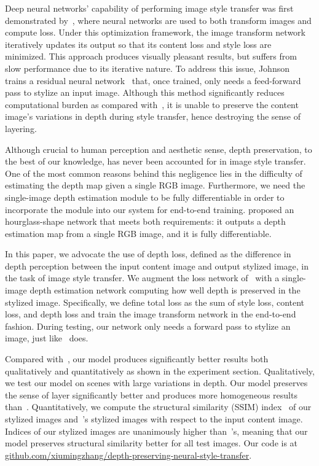 \documentclass[10pt,twocolumn,letterpaper]{article}
\begin{document}
Deep neural networks' capability of performing image style transfer was first demonstrated by~\cite{gatys2016image}, where neural networks are used to both transform images and compute loss. Under this optimization framework, the image transform network iteratively updates its output so that its content loss and style loss are minimized. This approach produces visually pleasant results, but suffers from slow performance due to its iterative nature. To address this issue, Johnson \etal~\cite{johnson2016perceptual} trains a residual neural network~\cite{he2016deep} that, once trained, only needs a feed-forward pass to stylize an input image. Although this method significantly reduces computational burden as compared with~\cite{gatys2016image}, it is unable to preserve the content image's variations in depth during style transfer, hence destroying the sense of layering.

Although crucial to human perception and aesthetic sense, depth preservation, to the best of our knowledge, has never been accounted for in image style transfer. One of the most common reasons behind this negligence lies in the difficulty of estimating the depth map given a single RGB image. Furthermore, we need the single-image depth estimation module to be fully differentiable in order to incorporate the module into our system for end-to-end training. \cite{chen2016single} proposed an hourglass-shape network that meets both requirements: it outputs a depth estimation map from a single RGB image, and it is fully differentiable. 

In this paper, we advocate the use of depth loss, defined as the difference in depth perception between the input content image and output stylized image, in the task of image style transfer. We augment the loss network of~\cite{johnson2016perceptual} with a single-image depth estimation network computing how well depth is preserved in the stylized image. Specifically, we define total loss as the sum of style loss, content loss, and depth loss and train the image transform network in the end-to-end fashion. During testing, our network only needs a forward pass to stylize an image, just like~\cite{johnson2016perceptual} does.

Compared with~\cite{johnson2016perceptual}, our model produces significantly better results both qualitatively and quantitatively as shown in the experiment section. Qualitatively, we test our model on scenes with large variations in depth. Our model preserves the sense of layer significantly better and produces more homogeneous results than~\cite{johnson2016perceptual}. Quantitatively, we compute the structural similarity (SSIM) index~\cite{wang2004image} of our stylized images and~\cite{johnson2016perceptual}'s stylized images with respect to the input content image. Indices of our stylized images are unanimously higher than~\cite{johnson2016perceptual}'s, meaning that our model preserves structural similarity better for all test images. Our code is at \url{github.com/xiumingzhang/depth-preserving-neural-style-transfer}.
\end{document}
